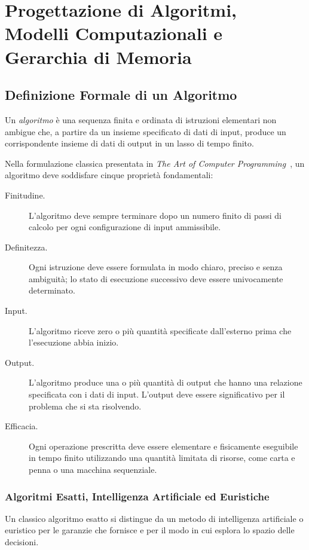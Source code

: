 \chapter{Progettazione di Algoritmi, Modelli Computazionali e Gerarchia di Memoria}
\label{cha:lecture-one}

\FloatBarrier
\section{Definizione Formale di un Algoritmo}
\label{sec:formal-algorithm}

Un \emph{algoritmo} è una sequenza finita e ordinata di istruzioni elementari non ambigue che, a partire da un insieme specificato di dati di input, produce un corrispondente insieme di dati di output in un lasso di tempo finito.

Nella formulazione classica presentata in \emph{The Art of Computer Programming}~\cite{knuth1997}, un algoritmo deve soddisfare cinque proprietà fondamentali:

\begin{description}
  \item[Finitudine.] L'algoritmo deve sempre terminare dopo un numero finito di passi di calcolo per ogni configurazione di input ammissibile.
  \item[Definitezza.] Ogni istruzione deve essere formulata in modo chiaro, preciso e senza ambiguità; lo stato di esecuzione successivo deve essere univocamente determinato.
  \item[Input.] L'algoritmo riceve zero o più quantità specificate dall'esterno prima che l'esecuzione abbia inizio.
  \item[Output.] L'algoritmo produce una o più quantità di output che hanno una relazione specificata con i dati di input. L'output deve essere significativo per il problema che si sta risolvendo.
  \item[Efficacia.] Ogni operazione prescritta deve essere elementare e fisicamente eseguibile in tempo finito utilizzando una quantità limitata di risorse, come carta e penna o una macchina sequenziale.
\end{description}

\FloatBarrier
\subsection{Algoritmi Esatti, Intelligenza Artificiale ed Euristiche}
\label{sec:exact-vs-heuristic}

Un classico algoritmo esatto si distingue da un metodo di intelligenza artificiale o euristico per le garanzie che fornisce e per il modo in cui esplora lo spazio delle decisioni.

